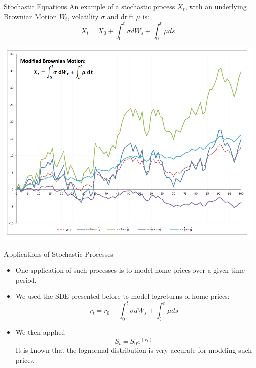 \documentclass{beamer}
\begin{document}
\begin{frame}{Stochastic Equations}
 An example of a stochastic process $X_t$, with an underlying Brownian Motion $W_t$, volatility $\sigma$ and drift $\mu$ is:
$$
X_t = X_{0} + \int_0^t\sigma dW_s + \int_0^t\mu ds
$$
\end{frame}

\begin{frame}
\includegraphics[scale = .45]{sigmaMu.png}
\end{frame}

\begin{frame}{Applications of Stochastic Processes}
\begin{itemize}
\item
One application of such processes is to model home prices over a given time period.
\item
We used the SDE presented before to model logreturns of home prices:
$$
r_t = r_0 + \int_0^t\sigma dW_s + \int_0^t\mu ds
$$
\item
We then applied 
$$
S_t = S_{0}e^{(r_t)}
$$
It is known that the lognormal distribution is very accurate for modeling such prices.
\end{itemize}
\end{frame}
\end{document}
